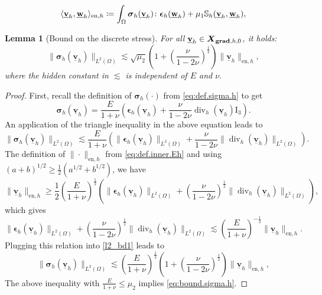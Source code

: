 \documentclass[10pt,a4paper]{amsart}
\newtheorem{lemma}{Lemma}
\newcommand{\DIV}{\operatorname{\mathrm{div}}}
\newcommand{\Id}{\mathrm{I}_3}
\def\O{\Omega}
\def\be{\boldsymbol{\epsilon}}
\def\bsig{\boldsymbol{\sigma}}
\def\ddgs{\boldsymbol{X}_{{\bf grad},h,0}}
\newcommand{\norm}[2]{\|#2\|_{#1}}
\newcommand{\uvec}[1]{\underline{\mathbf{#1}}}
\begin{document}
\begin{align}\label{eq:def.inner.Eh}
\langle\uvec{v}_h,\uvec{w}_h\rangle_{\mathrm{en},h}\coloneqq\int_{\Omega}\bsig_h(\underline{\bf v}_h)\colon\be_h(\underline{\bf w}_h)+\mu_{1}\mathbb S_h(\underline{\bf v}_h,\underline{\bf w}_h),
\end{align}

\begin{lemma}[Bound on the discrete stress]%
For all $\uvec{v}_{h}\in\ddgs$, it holds: 
\begin{equation}\label{eq:bound.sigma.h}
\norm{L^2(\O)}{\bsig_h(\uvec{v}_h)}\lesssim \sqrt{\mu_{2}} \left(1+\left(\frac{\nu}{1-2\nu}\right)^{\frac{1}{2}} \right) \norm{\mathrm{en},h}{\uvec{v}_h},
\end{equation}
where the hidden constant in $\lesssim$ is independent of $E$ and $\nu.$
\end{lemma}

\begin{proof}
First, recall the definition of $\bsig_h(\cdot)$ from \eqref{eq:def.sigma.h} to get
\begin{equation*}
    \bsig_h(\uvec{v}_h)= \frac{E}{1+\nu}\left(\be_h(\uvec{v}_h)+\frac{\nu}{1-2\nu} \DIV_h(\uvec{v}_h)\Id\right).
\end{equation*}
An application of the triangle inequality in the above equation leads to
\begin{equation}
\norm{L^2(\O)}{\bsig_h(\uvec{v}_h)} \lesssim \frac{E}{1+\nu}\left(\norm{L^2(\O)}{\be_h(\uvec{v}_h)}+\frac{\nu}{1-2\nu}\norm{L^2(\O)}{ \DIV_h(\uvec{v}_h)}\right). \label{l2_bd1}
\end{equation}
The definition of $\norm{\mathrm{en},h}{{\cdot}}$ from \eqref{eq:def.inner.Eh} and using $(a+b)^{1/2}\ge \frac12 (a^{1/2}+b^{1/2})$, we have
$$
\norm{\mathrm{en},h}{\uvec{v}_h}\ge \frac12 \left(\frac{E}{1+\nu}\right)^{\frac{1}{2}}
\left(\norm{L^2(\O)}{\be_h(\uvec{v}_h)}+\left(\frac{\nu}{1-2\nu}\right)^{\frac{1}{2}}\norm{L^2(\O)}{\DIV_h(\uvec{v}_h)}\right),
$$
which gives
$$
\norm{L^2(\O)}{\be_h(\uvec{v}_h)}+\left(\frac{\nu}{1-2\nu}\right)^{\frac{1}{2}}\norm{L^2(\O)}{\DIV_h(\uvec{v}_h)}\lesssim
\left(\frac{E}{1+\nu}\right)^{-\frac{1}{2}}\norm{\mathrm{en},h}{\uvec{v}_h}.
$$
Plugging this relation into \eqref{l2_bd1} leads to
$$
\norm{L^2(\O)}{\bsig_h(\uvec{v}_h)}
\lesssim \left(\frac{E}{1+\nu}\right)^{\frac{1}{2}}\left(1+\left(\frac{\nu}{1-2\nu}\right)^{\frac{1}{2}}\right)\norm{\mathrm{en},h}{\uvec{v}_h},
$$
The above inequality with $\frac{E}{1+\nu} \leq \mu_{2}$ implies \eqref{eq:bound.sigma.h}. 
\end{proof}
\end{document}
